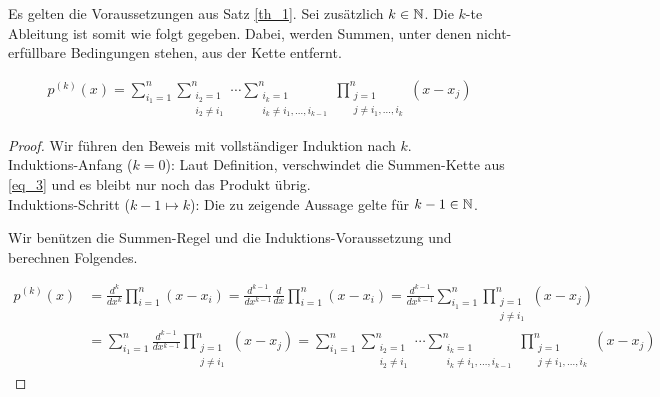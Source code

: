 \begin{corollary}

Es gelten die Voraussetzungen aus Satz \ref{th_1}.
Sei zusätzlich $k \in \mathbb{N}$.
Die $k$-te Ableitung ist somit wie folgt gegeben.
Dabei, werden Summen, unter denen nicht-erfüllbare Bedingungen stehen, aus der Kette entfernt.

\begin{align} \label{eq_3}
  p^{(k)}(x)
  =
  \sum_{i_1 = 1}^n
  \sum_{\substack{i_2 = 1 \\ i_2 \neq i_1}}^n
  \cdots
  \sum_{\substack{i_k = 1 \\ i_k \neq i_1, \ldots, i_{k-1}}}^n
  \prod_{\substack{j = 1 \\ j \neq i_1, \ldots, i_k}}^n
  (x - x_j)
\end{align}

\end{corollary}

\begin{proof}

Wir führen den Beweis mit vollständiger Induktion nach $k$. \\

Induktions-Anfang ($k = 0$):
Laut Definition, verschwindet die Summen-Kette aus \eqref{eq_3} und es bleibt nur noch das Produkt übrig. \\

Induktions-Schritt ($k-1 \mapsto k$):
Die zu zeigende Aussage gelte für $k-1 \in \mathbb{N}$.

Wir benützen die Summen-Regel und die Induktions-Voraussetzung und berechnen Folgendes.

\begin{align*}
  p^{(k)}(x)
  & =
  \frac{d^k}{dx^k}
  \prod_{i=1}^{n} (x - x_i)
  =
  \frac{d^{k-1}}{dx^{k-1}}
  \frac{d}{dx}
  \prod_{i=1}^{n} (x - x_i)
  =
  \frac{d^{k-1}}{dx^{k-1}}
  \sum_{i_1 = 1}^n
  \prod_{\substack{j=1 \\ j \neq i_1}}^n
  (x - x_j) \\
  & =
  \sum_{i_1 = 1}^n
  \frac{d^{k-1}}{dx^{k-1}}
  \prod_{\substack{j=1 \\ j \neq i_1}}^n
  (x - x_j)
  =
  \sum_{i_1 = 1}^n
  \sum_{\substack{i_2 = 1 \\ i_2 \neq i_1}}^n
  \cdots
  \sum_{\substack{i_k = 1 \\ i_k \neq i_1, \ldots, i_{k-1}}}^n
  \prod_{\substack{j = 1 \\ j \neq i_1, \ldots, i_k}}^n
  (x - x_j)
\end{align*}

\end{proof}
